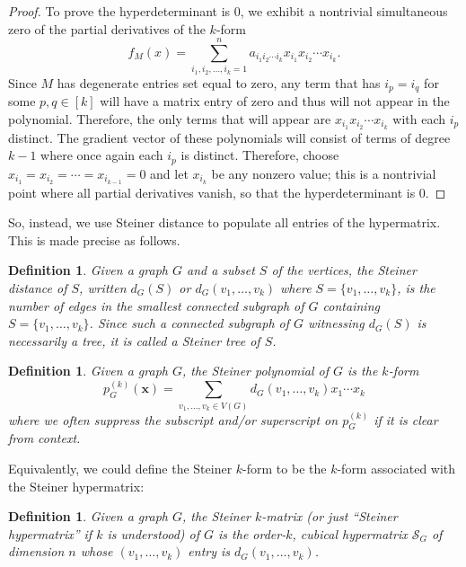 \documentclass{article}
\newtheorem{definition}[theorem]{Definition}
\begin{document}
\begin{proof}
To prove the hyperdeterminant is $0$, we exhibit a nontrivial simultaneous zero of the partial derivatives of the $k$-form 
$$
f_{M}(x) = \sum_{i_1,i_2,\ldots,i_k = 1}^n a_{i_1i_2\cdots i_k}x_{i_1}x_{i_2}\cdots x_{i_k}.
$$ 
Since $M$ has degenerate entries set equal to zero, any term that has $i_p = i_q$ for some $p,q \in [k]$ will have a matrix entry of zero and thus will not appear in the polynomial. Therefore, the only terms that will appear are $x_{i_1}x_{i_2}\cdots x_{i_k}$ with each $i_p$ distinct. The gradient vector of these polynomials will consist of terms of degree $k-1$ where once again each $i_p$ is distinct. Therefore, choose $x_{i_1} = x_{i_2} = \cdots = x_{i_{k-1}} = 0$ and let $x_{i_k}$ be any nonzero value; this is a nontrivial point where all partial derivatives vanish, so that the hyperdeterminant is $0$.  
\end{proof}

So, instead, we use Steiner distance to populate all entries of the hypermatrix.  This is made precise as follows.

\begin{definition} Given a graph $G$ and a subset $S$ of the vertices, the {\em Steiner distance} of $S$, written $d_G(S)$ or $d_G(v_1,\ldots,v_k)$ where $S = \{v_1,\ldots,v_k\}$, is the number of edges in the smallest connected subgraph of $G$ containing $S=\{v_1,\ldots,v_k\}$. Since such a connected subgraph of $G$ witnessing $d_G(S)$ is necessarily a tree, it is called a {\em Steiner tree} of $S$. 
\end{definition}


\begin{definition} Given a graph $G$, the {\em Steiner polynomial} of $G$ is the $k$-form 
$$
p^{(k)}_G(\mathbf{x}) = \sum_{v_1,\ldots,v_k \in V(G)} d_G(v_1,\ldots,v_k) x_1 \cdots x_k
$$
where we often suppress the subscript and/or superscript on $p^{(k)}_G$ if it is clear from context.
\end{definition}

Equivalently, we could define the Steiner $k$-form to be the $k$-form associated with the Steiner hypermatrix:

\begin{definition} Given a graph $G$, the {\em Steiner $k$-matrix} (or just ``Steiner hypermatrix'' if $k$ is understood) of $G$ is the order-$k$, cubical hypermatrix $\mathcal{S}_G$ of dimension $n$ whose $(v_1,\ldots,v_k)$ entry is $d_G(v_1,\ldots,v_k)$.
\end{definition}
\end{document}
